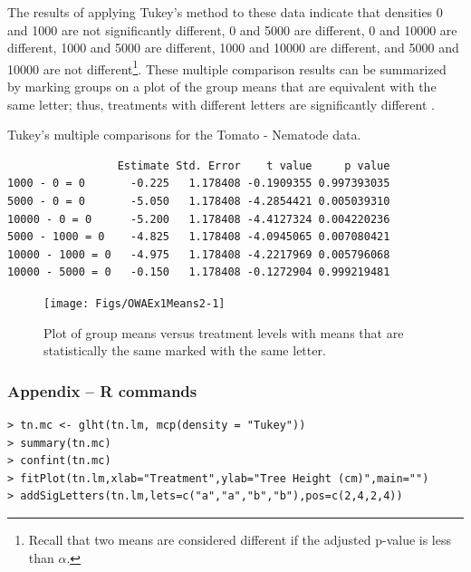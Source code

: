 \documentclass[10pt,openany]{book}\usepackage[]{graphicx}\usepackage[]{color}
\makeatletter
\newenvironment{kframe}{%
 \def\at@end@of@kframe{}%
 \ifinner\ifhmode%
  \def\at@end@of@kframe{\end{minipage}}%
  \begin{minipage}{\columnwidth}%
 \fi\fi%
 \def\FrameCommand##1{\hskip\@totalleftmargin \hskip-\fboxsep
 \colorbox{shadecolor}{##1}\hskip-\fboxsep
     \hskip-\linewidth \hskip-\@totalleftmargin \hskip\columnwidth}%
 \MakeFramed {\advance\hsize-\width
   \@totalleftmargin\z@ \linewidth\hsize
   \@setminipage}}%
 {\par\unskip\endMakeFramed%
 \at@end@of@kframe}
\newenvironment{knitrout}{}{} %
\makeatother
\begin{document}
The results of applying Tukey's method to these data  indicate that densities 0 and 1000 are not significantly different, 0 and 5000 are different, 0 and 10000 are different, 1000 and 5000 are different, 1000 and 10000 are different, and 5000 and 10000 are not different\footnote{Recall that two means are considered different if the adjusted p-value is less than $\alpha$.}.  These multiple comparison results can be summarized by marking groups on a plot of the group means that are equivalent with the same letter; thus, treatments with different letters are significantly different .

\begin{table}[h]
  \centering
  \caption{Tukey's multiple comparisons for the Tomato - Nematode data.}\label{tab:OWAEx1HSD}
\begin{knitrout}
\color{fgcolor}\begin{kframe}
\begin{verbatim}
                 Estimate Std. Error    t value     p value
1000 - 0 = 0       -0.225   1.178408 -0.1909355 0.997393035
5000 - 0 = 0       -5.050   1.178408 -4.2854421 0.005039310
10000 - 0 = 0      -5.200   1.178408 -4.4127324 0.004220236
5000 - 1000 = 0    -4.825   1.178408 -4.0945065 0.007080421
10000 - 1000 = 0   -4.975   1.178408 -4.2217969 0.005796068
10000 - 5000 = 0   -0.150   1.178408 -0.1272904 0.999219481
\end{verbatim}
\end{kframe}
\end{knitrout}
\end{table}

\begin{knitrout}
\color{fgcolor}\begin{figure}[hbtp]

{\centering \texttt{[image: Figs/OWAEx1Means2-1]} 

}

\caption[Plot of group means versus treatment levels with means that are statistically the same marked with the same letter]{Plot of group means versus treatment levels with means that are statistically the same marked with the same letter.}\label{fig:OWAEx1Means2}
\end{figure}


\end{knitrout}

\subsubsection*{Appendix -- R commands}
\begin{Verbatim}[formatcom=\color{red},xleftmargin=5mm,commandchars=\\\{\}]
> tn.mc <- glht(tn.lm, mcp(density = "Tukey"))
> summary(tn.mc)
> confint(tn.mc)
> fitPlot(tn.lm,xlab="Treatment",ylab="Tree Height (cm)",main="")
> addSigLetters(tn.lm,lets=c("a","a","b","b"),pos=c(2,4,2,4))
\end{Verbatim}
\end{document}
